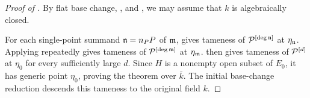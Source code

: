 \begin{proof}[Proof of ]
By flat base change, , and
, we may assume
that $k$ is algebraically closed.

For each single-point summand $\mathfrak{n}=n_P P$ of $\mathfrak{m}$,
 gives tameness of
$\mathcal{P}^{[\deg\mathfrak{n}]}$ at $\eta_{\mathfrak{n}}$. Applying
 repeatedly gives tameness of
$\mathcal{P}^{[\deg\mathfrak{m}]}$ at $\eta_{\mathfrak{m}}$.
 then gives tameness of
$\mathcal{P}^{[d]}$ at $\eta_0$ for every sufficiently large $d$. Since $H$ is a
nonempty open subset of $E_0$, it has generic point $\eta_0$, proving
the theorem over $\bar{k}$. The initial base-change reduction descends this
tameness to the original field $k$.
\end{proof}

